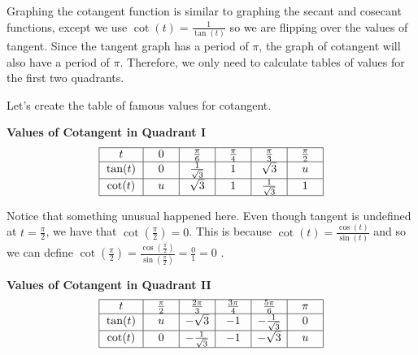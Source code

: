 \documentclass[nooutcomes, noauthor]{ximera}
\begin{document}
Graphing the cotangent function is similar to graphing the secant and cosecant functions, except we use $\cot(t)=\frac{1}{\tan(t)}$ so we are flipping over the values of tangent.  Since the tangent graph has a period of $\pi$, the graph of cotangent will also have a period of $\pi$.  Therefore, we only need to calculate tables of values for the first two quadrants.

Let's create the table of famous values for cotangent.

\begin{center}
\textbf{Values of Cotangent in Quadrant I}
\renewcommand*{\arraystretch}{2.5}
\setlength{\arrayrulewidth}{0.5mm}
\setlength{\tabcolsep}{18pt}
\[
\begin{array}{|>{\centering\arraybackslash$} p{1cm} <{$} | >{\centering\arraybackslash$} p{.75cm} <{$} |  >{\centering\arraybackslash$} p{.75cm} <{$} |  >{\centering\arraybackslash$} p{.75cm} <{$} |  >{\centering\arraybackslash$} p{.75cm} <{$} |  >{\centering\arraybackslash$} p{.75cm} <{$} |}
\hline 
t & 0 & \frac{\pi}{6} & \frac{\pi}{4} & \frac{\pi}{3} & \frac{\pi}{2}\\
\hline
\tan(t) & 0 & \frac{1}{\sqrt{3}} &1 & \sqrt{3} & u\\
\hline
\cot(t) & u & \sqrt{3} & 1 & \frac{1}{\sqrt{3}}& 1\\
\hline 
\end{array}
\]
\end{center}

Notice that something unusual happened here.  Even though tangent is undefined at $t=\frac{\pi}{2}$, we have that $\cot\left(\frac{\pi}{2}\right)=0$.  This is because $\cot(t)=\frac{\cos(t)}{\sin(t)}$ and so we can define $\cot\left(\frac{\pi}{2}\right)=\frac{\cos\left(\frac{\pi}{2}\right)}{\sin\left(\frac{\pi}{2}\right)}=\frac{0}{1}=0$ .

\begin{center}
\textbf{Values of Cotangent in Quadrant II}
\renewcommand*{\arraystretch}{2.5}
\setlength{\arrayrulewidth}{0.5mm}
\setlength{\tabcolsep}{18pt}
\[
\begin{array}{|>{\centering\arraybackslash$} p{1cm} <{$} | >{\centering\arraybackslash$} p{.75cm} <{$} |  >{\centering\arraybackslash$} p{.75cm} <{$} |  >{\centering\arraybackslash$} p{.75cm} <{$} |  >{\centering\arraybackslash$} p{.75cm} <{$} |  >{\centering\arraybackslash$} p{.75cm} <{$} |}
\hline 
t & \frac{\pi}{2} & \frac{2\pi}{3} & \frac{3\pi}{4} & \frac{5\pi}{6} & \pi\\
\hline
\tan(t) & u & -\sqrt{3} & -1 & -\frac{1}{\sqrt{3}} & 0\\
\hline
\cot(t) & 0 & -\frac{1}{\sqrt{3}}& -1 & -\sqrt{3} & u\\
\hline 
\end{array}
\]
\end{center}
\end{document}
